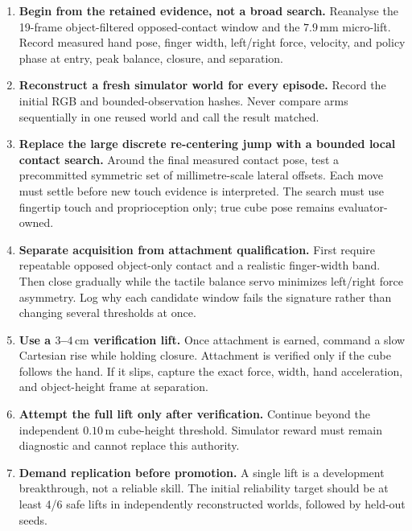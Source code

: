 \begin{enumerate}
  \item \textbf{Begin from the retained evidence, not a broad search.}
        Reanalyse the 19-frame object-filtered opposed-contact window and the
        $7.9\,\mathrm{mm}$ micro-lift.  Record measured hand pose, finger width,
        left/right force, velocity, and policy phase at entry, peak balance,
        closure, and separation.

  \item \textbf{Reconstruct a fresh simulator world for every episode.}
        Record the initial RGB and bounded-observation hashes.  Never compare
        arms sequentially in one reused world and call the result matched.

  \item \textbf{Replace the large discrete re-centering jump with a bounded
        local contact search.}  Around the final measured contact pose, test a
        precommitted symmetric set of millimetre-scale lateral offsets.  Each
        move must settle before new touch evidence is interpreted.  The search
        must use fingertip touch and proprioception only; true cube pose remains
        evaluator-owned.

  \item \textbf{Separate acquisition from attachment qualification.}
        First require repeatable opposed object-only contact and a realistic
        finger-width band.  Then close gradually while the tactile balance
        servo minimizes left/right force asymmetry.  Log why each candidate
        window fails the signature rather than changing several thresholds at
        once.

  \item \textbf{Use a $3$--$4\,\mathrm{cm}$ verification lift.}
        Once attachment is earned, command a slow Cartesian rise while holding
        closure.  Attachment is verified only if the cube follows the hand.
        If it slips, capture the exact force, width, hand acceleration, and
        object-height frame at separation.

  \item \textbf{Attempt the full lift only after verification.}
        Continue beyond the independent $0.10\,\mathrm{m}$ cube-height
        threshold.  Simulator reward must remain diagnostic and cannot replace
        this authority.

  \item \textbf{Demand replication before promotion.}
        A single lift is a development breakthrough, not a reliable skill.
        The initial reliability target should be at least 4/6 safe lifts in
        independently reconstructed worlds, followed by held-out seeds.
\end{enumerate}

